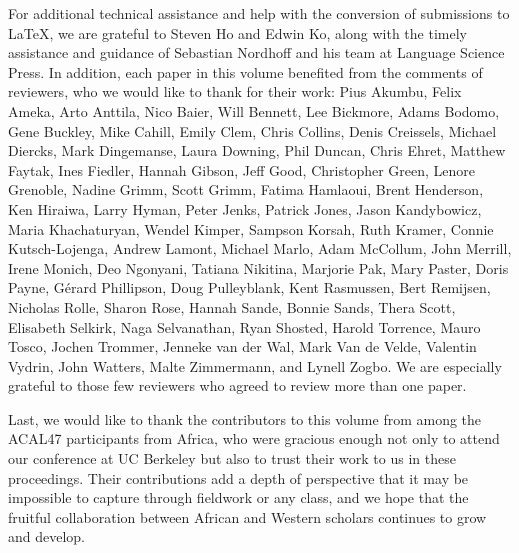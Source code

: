 \begin{refsection}
For additional technical assistance and help with the conversion of submissions to \LaTeX, we are grateful to Steven Ho and Edwin Ko, along with the timely assistance and guidance of Sebastian Nordhoff and his team at Language Science Press. In addition, each paper in this volume benefited from the comments of reviewers, who we would like to thank for their work: Pius Akumbu, Felix Ameka, Arto Anttila, Nico Baier, Will Bennett, Lee Bickmore, Adams Bodomo, Gene Buckley, Mike Cahill, Emily Clem, Chris Collins, Denis Creissels, Michael Diercks, Mark Dingemanse, Laura Downing, Phil Duncan, Chris Ehret, Matthew Faytak, Ines Fiedler, Hannah Gibson, Jeff Good, Christopher Green, Lenore Grenoble, Nadine Grimm, Scott Grimm, Fatima Hamlaoui, Brent Henderson, Ken Hiraiwa, Larry Hyman, Peter Jenks, Patrick Jones, Jason Kandybowicz, Maria Khachaturyan, Wendel Kimper, Sampson Korsah, Ruth Kramer, Connie Kutsch-Lojenga, Andrew Lamont, Michael Marlo, Adam McCollum, John Merrill, Irene Monich, Deo Ngonyani, Tatiana Nikitina, Marjorie Pak, Mary Paster, Doris Payne, G\'erard Phillipson, Doug Pulleyblank, Kent Rasmussen, Bert Remijsen, Nicholas Rolle, Sharon Rose, Hannah Sande, Bonnie Sands, Thera Scott, Elisabeth Selkirk, Naga Selvanathan, Ryan Shosted, Harold Torrence, Mauro Tosco, Jochen Trommer, Jenneke van der Wal, Mark Van de Velde, Valentin Vydrin, John Watters, Malte Zimmermann, and Lynell Zogbo. We are especially grateful to those few reviewers who agreed to review more than one paper.

Last, we would like to thank the contributors to this volume from among the ACAL47 participants from Africa, who were gracious enough not only to attend our conference at UC Berkeley but also to trust their work to us in these proceedings. Their contributions add a depth of perspective that it may be impossible to capture through fieldwork or any class, and we hope that the fruitful collaboration between African and Western scholars continues to grow and develop.


\printbibliography[heading=subbibliography]
\end{refsection}

